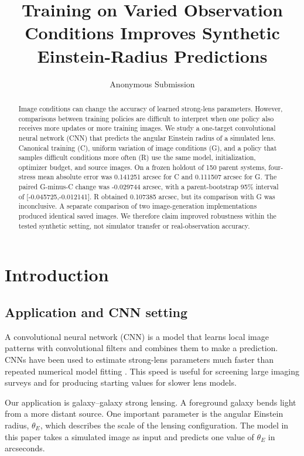 \documentclass[letterpaper]{article}
\title{Training on Varied Observation Conditions Improves Synthetic Einstein-Radius Predictions}
\author{Anonymous Submission}
\begin{document}
\maketitle

\begin{abstract}
Image conditions can change the accuracy of learned strong-lens parameters.
However, comparisons between training policies are difficult to interpret when
one policy also receives more updates or more training images. We study a
one-target convolutional neural network (CNN) that predicts the angular
Einstein radius of a simulated lens. Canonical training (C), uniform variation
of image conditions (G), and a policy that samples difficult conditions more
often (R) use the same model, initialization, optimizer budget, and source
images. On a frozen holdout of 150 parent systems, four-stress mean absolute
error was 0.141251 arcsec for C and 0.111507 arcsec for G. The paired G-minus-C
change was -0.029744 arcsec, with a parent-bootstrap 95\% interval of
[-0.045725,-0.012141]. R obtained 0.107385 arcsec, but its comparison with G
was inconclusive. A separate comparison of two image-generation
implementations produced identical saved images. We therefore claim improved
robustness within the tested synthetic setting, not simulator transfer or
real-observation accuracy.
\end{abstract}

\section{Introduction}

\subsection{Application and CNN setting}

A convolutional neural network (CNN) is a model that learns local image
patterns with convolutional filters and combines them to make a prediction.
CNNs have been used to estimate strong-lens parameters much faster than
repeated numerical model fitting \citep{hezaveh2017fast}. This speed is useful
for screening large imaging surveys and for producing starting values for
slower lens models.

Our application is galaxy--galaxy strong lensing. A foreground galaxy bends
light from a more distant source. One important parameter is the angular
Einstein radius, $\theta_E$, which describes the scale of the lensing
configuration. The model in this paper takes a simulated image as input and
predicts one value of $\theta_E$ in arcseconds.
\end{document}
